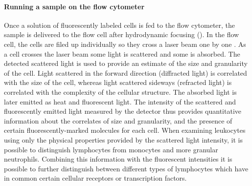 \paragraph{Running a sample on the flow cytometer}
Once a solution of fluorescently labeled cells is fed to the flow cytometer,
the sample is delivered to the flow cell after hydrodynamic focusing ().
In the flow cell, the cells are filed up individually so they cross a laser beam one by one \citep{Shapiro:2003vq}.
As a cell crosses the laser beam some light is scattered and some is absorbed. The detected scattered light is used to provide an estimate of the size and granularity of the cell.
Light scattered in the forward direction (diffracted light) is correlated with the size of the cell, whereas light scattered sideways (refracted light) is correlated with the complexity of the cellular structure.
The absorbed light is later emitted as heat and fluorescent light.
The intensity of the scattered and fluorescently emitted light measured by the detector thus provides quantitative information about the correlates of size and granularity,
and the presence of certain fluorescently-marked molecules for each cell.
When examining leukocytes using only the physical properties provided by the scattered light intensity, it is possible to distinguish lymphocytes from monocytes and more granular neutrophils.
Combining this information with the fluorescent intensities it is possible to further distinguish between different types of lymphocytes which have in common certain cellular receptors or transcription factors.

